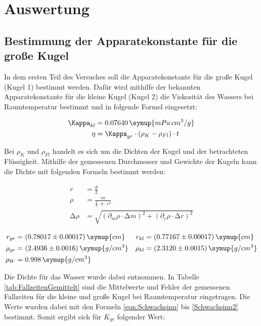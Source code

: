 \newpage

\section{Auswertung}

\subsection{Bestimmung der Apparatekonstante für die große Kugel}

In dem ersten Teil des Versuches soll die Apparatekonstante für die große Kugel
(Kugel 1) bestimmt werden. Dafür wird mithilfe der bekannten Apparatekonstante
für die kleine Kugel (Kugel 2) die Viskosität des Wassers bei Raumtemperatur
bestimmt und in folgende Formel eingesetzt:

\begin{align}
  \label{eqn:KappaGroß}
  \Kappa_{kl}     &= 0.07640 \, \symup{mPa\, cm^3 / g} \\
  \eta            &= \Kappa_{gr} \cdot \left( \rho_K - \rho_{Fl} \right) \cdot t
    \label{eqn:Etta}
\end{align}

Bei $\rho_K$ und $\rho_{Fl}$ handelt es sich um die Dichten der Kugel und der betrachteten
Flüssigkeit. Mithilfe der gemessenen Durchmesser und Gewichte der Kugeln kann die Dichte
mit folgenden Formeln bestimmt werden:

\begin{align}
  r               &= \frac{d}{2} \\
  \rho            &= \frac{m}{\frac{4}{3} \cdot \pi \cdot r^2} \\
  \increment \rho &= \sqrt{ \left(\partial_m \rho \cdot \increment m \right) ^2 +
                    \left( \partial_r \rho \cdot \increment r \right) ^2}
\end{align}

\begin{align}
  r_{gr}    &= (0.78017 \pm 0.00017) \, \symup{cm}     & r_{kl}    &= (0.77167 \pm 0.00017) \, \symup{cm} \\
  \rho_{gr} &= (2.4936 \pm 0.0016) \, \symup{g/cm^3} & \rho_{kl} &= (2.3120 \pm 0.0015) \, \symup{g/cm^3} \\
  \rho_{W}  &= 0.998 \, \symup{g/cm^3}
  \label{eqn:Daten}
\end{align}

Die Dichte für das Wasser wurde dabei \cite{Kohlrausch} entnommen. In Tabelle
\ref{tab:FallzeitenGemittelt} sind die Mittelwerte und Fehler der gemessenen
Fallzeiten für die kleine und große Kugel bei Raumtemperatur eingetragen. Die
Werte wurden dabei mit den Formeln \eqref{eqn:Schwachsinn} bis \eqref{Schwachsinn2} bestimmt.
Somit ergibt sich für $K_{gr}$ folgender Wert:

